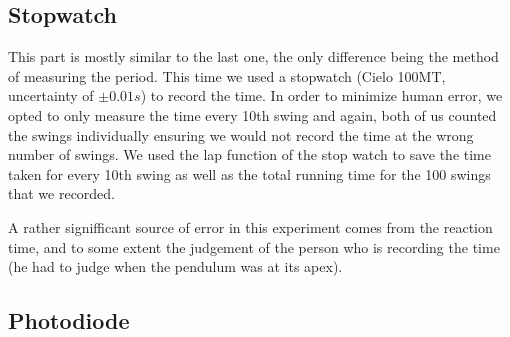 \documentclass[%
 reprint,
 amsmath,amssymb,
 aps,
]{revtex4-1}
\begin{document}
    \subsection{\label{subsect:exp_stopwatch}Stopwatch}
        This part is mostly similar to the last one, the only difference being the method of measuring the period. This time we used a stopwatch (Cielo 100MT, uncertainty of $\pm 0.01s$) to record the time. In order to minimize human error, we opted to only measure the time every 10th swing and again, both of us counted the swings individually ensuring we would not record the time at the wrong number of swings. We used the lap function of the stop watch to save the time taken for every 10th swing as well as the total running time for the 100 swings that we recorded.

        A rather signifficant source of error in this experiment comes from the reaction time, and to some extent the judgement of the person who is recording the time (he had to judge when the pendulum was at its apex).


	\subsection{\label{subsect:exp_photodiode}Photodiode}
\end{document}
